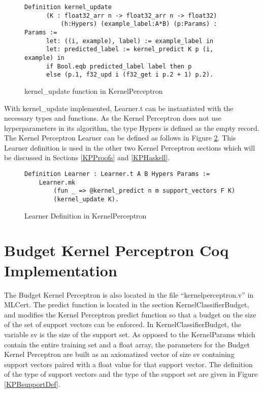\begin{figure}
    \caption{kernel\_update function in KernelPerceptron}
    \label{kernel_updateDef}
    \begin{lstlisting}
Definition kernel_update 
      (K : float32_arr n -> float32_arr n -> float32)
          (h:Hypers) (example_label:A*B) (p:Params) : Params :=
      let: ((i, example), label) := example_label in 
      let: predicted_label := kernel_predict K p (i, example) in
      if Bool.eqb predicted_label label then p
      else (p.1, f32_upd i (f32_get i p.2 + 1) p.2).
    \end{lstlisting}
\end{figure}

With kernel\_update implemented, Learner.t can be instantiated with the necessary types and functions. As the Kernel Perceptron does not use hyperparameters in its algorithm, the type Hypers is defined as the empty record. The Kernel Perceptron Learner can be defined as follows in Figure \ref{kpLearnerDef}. This Learner definition is used in the other two Kernel Perceptron sections which will be discussed in Sections \ref{KPProofs} and \ref{KPHaskell}.

\begin{figure}
    \caption{Learner Definition in KernelPerceptron}
    \label{kpLearnerDef}
    \begin{lstlisting}
Definition Learner : Learner.t A B Hypers Params :=
    Learner.mk
        (fun _ => @kernel_predict n m support_vectors F K)
        (kernel_update K).
    \end{lstlisting}
\end{figure}

\section{Budget Kernel Perceptron Coq Implementation}\label{KPBCoqImp}
The Budget Kernel Perceptron is also located in the file ``kernelperceptron.v'' in MLCert. The predict function is located in the section KernelClassifierBudget, and modifies the Kernel Perceptron predict function so that a budget on the size of the set of support vectors can be enforced. In KernelClassifierBudget, the variable sv is the size of the support set. As opposed to the KernelParams which contain the entire training set and a float array, the parameters for the Budget Kernel Perceptron are built as an axiomatized vector of size sv containing support vectors paired with a float value for that support vector. The definition of the type of support vectors and the type of the support set are given in Figure \ref{KPBsupportDef}. 

